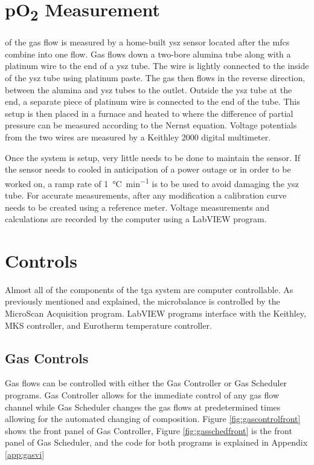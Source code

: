 \section{pO\textsubscript{2} Measurement}
     of the gas flow is measured by a home-built \gls{ysz} sensor located after the \glspl{mfc} combine into one flow.
    Gas flows down a two-bore alumina tube along with a platinum wire to the end of a \gls{ysz} tube.
    The wire is lightly connected to the inside of the \gls{ysz} tube using platinum paste.
    The gas then flows in the reverse direction, between the alumina and \gls{ysz} tubes to the outlet.
    Outside the \gls{ysz} tube at the end, a separate piece of platinum wire is connected to the end of the tube.
    This setup is then placed in a furnace and heated to  where the difference of partial pressure can be measured according to the Nernst equation.
    Voltage potentials from the two wires are measured by a Keithley 2000 digital multimeter.

    Once the system is setup, very little needs to be done to maintain the sensor.
    If the sensor needs to cooled in anticipation of a power outage or in order to be worked on, a ramp rate of \SI{1}{\celsius\per\minute} is to be used to avoid damaging the \gls{ysz} tube.
    For accurate  measurements, after any modification a calibration curve needs to be created using a reference meter.
    Voltage measurements and  calculations are recorded by the computer using a LabVIEW program.

\section{Controls}
    Almost all of the components of the \gls{tga} system are computer controllable.
    As previously mentioned and explained, the microbalance is controlled by the MicroScan Acquisition program.
    LabVIEW programs interface with the Keithley, MKS controller, and Eurotherm temperature controller.

    \subsection{Gas Controls}
        Gas flows can be controlled with either the Gas Controller or Gas Scheduler programs.
        Gas Controller allows for the immediate control of any gas flow channel while Gas Scheduler changes the gas flows at predetermined times allowing for the automated changing of composition.
        Figure \ref{fig:gascontrolfront} shows the front panel of Gas Controller, Figure \ref{fig:gasschedfront} is the front panel of Gas Scheduler, and the code for both programs is explained in Appendix \ref{app:gasvi}

